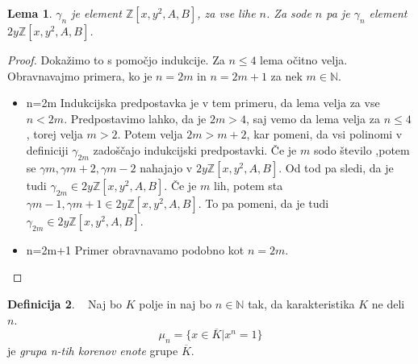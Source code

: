 \documentclass[12pt,a4paper,twoside]{article}
\theoremstyle{definition} %
\newtheorem{definicija}{Definicija}[section]
\theoremstyle{plain} %
\newtheorem{lema}[definicija]{Lema}
\numberwithin{equation}{section}  %
\newcommand{\N}{\mathbb N}
\newcommand{\Z}{\mathbb Z}
\begin{document}
\begin{lema}

$\gamma_{n}$ je element $\Z[x,y^2,A,B]$, za vse lihe $n$.  Za sode $n$ pa je $\gamma_{n}$ element $2y\Z[x,y^2,A,B]$.

\end{lema}

\begin{proof}
Dokažimo to s pomočjo indukcije. Za $n \leq 4$ lema očitno velja. Obravnavajmo primera, ko je $n=2m$ in  $n=2m+1$ za nek $m\in\N$.
\begin{itemize}
\item{n=2m}
Indukcijska predpostavka je v tem primeru, da lema velja za vse $n<2m$.
Predpostavimo lahko, da je $2m>4$, saj vemo da lema velja za $n\leq 4$, torej velja $m>2$. Potem velja $2m>m+2$, kar pomeni, da vsi polinomi v definiciji $\gamma_{2m}$ zadoščajo indukcijski predpostavki. Če je $m$ sodo število ,potem se $\gamma{m},\gamma{m+2},\gamma{m-2}$ nahajajo v $2y\Z[x,y^2,A,B]$. Od tod pa sledi, da je tudi $\gamma_{2m} \in 2y\Z[x,y^2,A,B]$.
Če je $m$ lih, potem sta $\gamma{m-1},\gamma{m+1} \in 2y\Z[x,y^2,A,B]$. To pa pomeni, da je tudi  $\gamma_{2m} \in 2y\Z[x,y^2,A,B]$.
\item{n=2m+1}
Primer obravnavamo podobno kot $n=2m$.


\end{itemize}


\end{proof}

\begin{definicija}~
Naj bo $K$ polje in naj bo $n \in \N$ tak, da karakteristika $K$ ne deli $n$.
$$\mu_n = \{ x \in \overline{K} | x^n = 1 \}$$
je \emph{grupa n-tih korenov enote} grupe $\overline{K}$.
\end{definicija}
\end{document}
